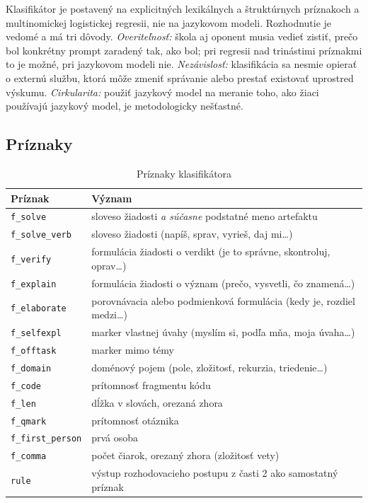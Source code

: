 Klasifikátor je postavený na explicitných lexikálnych a štruktúrnych príznakoch a multinomickej logistickej regresii, nie na jazykovom modeli. Rozhodnutie je vedomé a má tri dôvody. \emph{Overiteľnosť:} škola aj oponent musia vedieť zistiť, prečo bol konkrétny prompt zaradený tak, ako bol; pri regresii nad trinástimi príznakmi to je možné, pri jazykovom modeli nie. \emph{Nezávislosť:} klasifikácia sa nesmie opierať o externú službu, ktorá môže zmeniť správanie alebo prestať existovať uprostred výskumu. \emph{Cirkularita:} použiť jazykový model na meranie toho, ako žiaci používajú jazykový model, je metodologicky nešťastné.

\subsection{Príznaky}

\begin{table}[H]
\centering
\caption{Príznaky klasifikátora}
\label{tab:priznaky}
\small
\begin{tabularx}{\textwidth}{@{}l X@{}}
\toprule
\textbf{Príznak} & \textbf{Význam} \\
\midrule
\texttt{f\_solve}        & sloveso žiadosti \emph{a súčasne} podstatné meno artefaktu \\
\texttt{f\_solve\_verb}  & sloveso žiadosti (napíš, sprav, vyrieš, daj mi\ldots) \\
\texttt{f\_verify}       & formulácia žiadosti o verdikt (je to správne, skontroluj, oprav\ldots) \\
\texttt{f\_explain}      & formulácia žiadosti o význam (prečo, vysvetli, čo znamená\ldots) \\
\texttt{f\_elaborate}    & porovnávacia alebo podmienková formulácia (kedy je, rozdiel medzi\ldots) \\
\texttt{f\_selfexpl}     & marker vlastnej úvahy (myslím si, podľa mňa, moja úvaha\ldots) \\
\texttt{f\_offtask}      & marker mimo témy \\
\texttt{f\_domain}       & doménový pojem (pole, zložitosť, rekurzia, triedenie\ldots) \\
\texttt{f\_code}         & prítomnosť fragmentu kódu \\
\texttt{f\_len}          & dĺžka v slovách, orezaná zhora \\
\texttt{f\_qmark}        & prítomnosť otáznika \\
\texttt{f\_first\_person}& prvá osoba \\
\texttt{f\_comma}        & počet čiarok, orezaný zhora (zložitosť vety) \\
\texttt{rule}            & výstup rozhodovacieho postupu z časti 2 ako samostatný príznak \\
\bottomrule
\end{tabularx}
\end{table}

